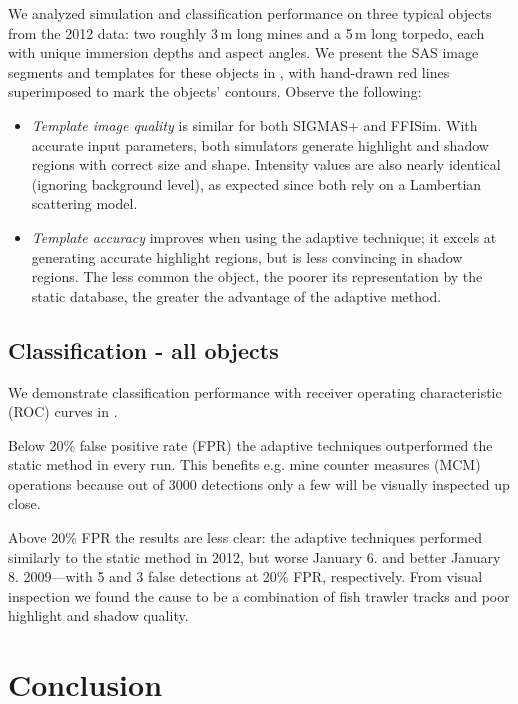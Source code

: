 We analyzed simulation and classification performance on three typical objects from the 2012 data: two roughly 3\,m long mines and a 5\,m long torpedo, each with unique immersion depths and aspect angles. We present the SAS image segments and templates for these objects in , with hand-drawn red lines superimposed to mark the objects' contours. Observe the following:
%
\begin{itemize}
\item \emph{Template image quality} is similar for both SIGMAS+ and FFISim. With accurate input parameters, both simulators generate highlight and shadow regions with correct size and shape. Intensity values are also nearly identical (ignoring background level), as expected since both rely on a Lambertian scattering model.
\item \emph{Template accuracy} improves when using the adaptive technique; it excels at generating accurate highlight regions, but is less convincing in shadow regions. The less common the object, the poorer its representation by the static database, the greater the advantage of the adaptive method.
\end{itemize}



\subsection{Classification - all objects}

We demonstrate classification performance with receiver operating characteristic (ROC) curves in . 

Below 20\% false positive rate (FPR) the adaptive techniques outperformed the static method in every run. This benefits e.g. mine counter measures (MCM) operations because out of 3000 detections only a few will be visually inspected up close.

Above 20\% FPR the results are less clear: the adaptive techniques performed similarly to the static method in 2012, but worse January 6. and better January 8. 2009---with 5 and 3 false detections at 20\% FPR, respectively. From visual inspection we found the cause to be a combination of fish trawler tracks and poor highlight and shadow quality.



\section{Conclusion}\label{IV_conclusion}


